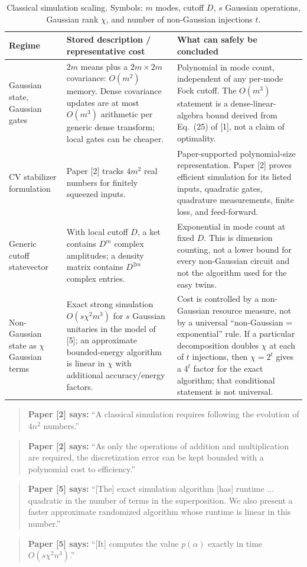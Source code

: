 \documentclass[10pt]{article}
\newcommand{\paperquote}[2]{%
  \begin{quote}\small\textbf{Paper [#1] says:} ``#2''\end{quote}}
\begin{document}
\begin{table}[h]
\centering\small
\begin{tabularx}{\textwidth}{@{}p{}p{}Y@{}}
\toprule
Regime & Stored description / representative cost & What can safely be concluded\\
\midrule
Gaussian state, Gaussian gates &
$2m$ means plus a $2m\times2m$ covariance: $O(m^2)$ memory.
Dense covariance updates are at most $O(m^3)$ arithmetic per generic dense transform; local gates
can be cheaper. &
Polynomial in mode count, independent of any per-mode Fock cutoff. The $O(m^3)$ statement is a
dense-linear-algebra bound derived from Eq.~(25) of [1], not a claim of optimality.\\
\addlinespace
CV stabilizer formulation &
Paper [2] tracks $4m^2$ real numbers for finitely squeezed inputs. &
Paper-supported polynomial-size representation. Paper [2] proves efficient simulation for its listed
inputs, quadratic gates, quadrature measurements, finite loss, and feed-forward.\\
\addlinespace
Generic cutoff statevector &
With local cutoff $D$, a ket contains $D^m$ complex amplitudes; a density matrix contains $D^{2m}$
complex entries. &
Exponential in mode count at fixed $D$. This is dimension counting, not a lower bound for every
non-Gaussian circuit and not the algorithm used for the easy twins.\\
\addlinespace
Non-Gaussian state as $\chi$ Gaussian terms &
Exact strong simulation $O(s\chi^2m^3)$ for $s$ Gaussian unitaries in the model of [5];
an approximate bounded-energy algorithm is linear in $\chi$ with additional accuracy/energy factors. &
Cost is controlled by a non-Gaussian resource measure, not by a universal ``non-Gaussian =
exponential'' rule. If a particular decomposition doubles $\chi$ at each of $t$ injections, then
$\chi=2^t$ gives a $4^t$ factor for the exact algorithm; that conditional statement is not universal.\\
\bottomrule
\end{tabularx}
\caption{Classical simulation scaling. Symbols: $m$ modes, cutoff $D$, $s$ Gaussian operations,
Gaussian rank $\chi$, and number of non-Gaussian injections $t$.}
\end{table}

\paperquote{2}{A classical simulation requires following the evolution of \(4n^2\) numbers.}
\paperquote{2}{As only the operations of addition and multiplication are required, the
discretization error can be kept bounded with a polynomial cost to efficiency.}
\paperquote{5}{[The] exact simulation algorithm [has] runtime ... quadratic in the number of terms in
the superposition. We also present a faster approximate randomized algorithm whose runtime is linear
in this number.}
\paperquote{5}{[It] computes the value \(p(\alpha)\) exactly in time
\(O(s\chi^2n^3)\).}
\end{document}
